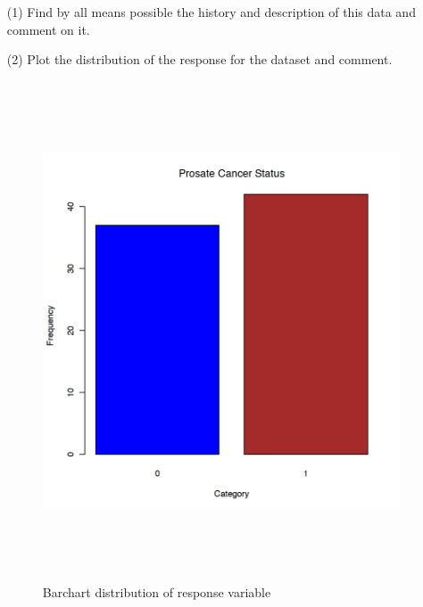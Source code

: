 \documentclass[12pt,a4paper]{article}
\begin{document}
\begin{enumerate}
		\item[(1)] Find by all means possible the history and description of this data and comment on it.
		\item[(2)]  Plot the distribution of the response for the dataset and comment.\\
		\begin{figure}[!h]
				\includegraphics[width=480pt,height=420pt]{./graphics/q21.png}
				\caption{Barchart distribution of response variable}
				\label{fig:01}
		\end{figure}
		

\end{enumerate}
\end{document}
